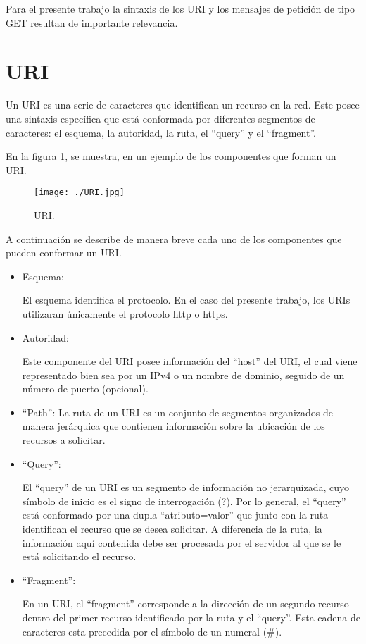 Para el presente trabajo la sintaxis de los URI y los mensajes de petición de tipo GET resultan de importante relevancia.

\section{URI} \label{URIsection}

Un URI es una serie de caracteres que identifican un recurso en la red. Este posee una sintaxis específica que está conformada por diferentes segmentos de caracteres: el esquema, la autoridad, la ruta, el ``query'' y el ``fragment''.

En la figura \ref{fig:URI}, se muestra, en un ejemplo de los componentes que forman un URI.

\begin{figure}[H]
\begin{center}
\texttt{[image: ./URI.jpg]}
\caption{URI.}
\label{fig:URI}
\end{center}
\end{figure}

A continuaci\'on se describe de manera breve cada uno de los componentes que pueden conformar un URI.

\begin{itemize}

\item Esquema:

El esquema identifica el protocolo. En el caso del presente trabajo, los URIs utilizaran únicamente el protocolo http o https.


\item Autoridad:

Este componente del URI posee información del ``host'' del URI, el cual viene representado bien sea por un IPv4 o un nombre de dominio, seguido de un número de puerto (opcional).
   
\item ``Path'':
La ruta de un URI es un conjunto de segmentos organizados de manera jerárquica que contienen información sobre la ubicación de los recursos a solicitar.

\item ``Query'':

El ``query'' de un URI es un segmento de información no jerarquizada, cuyo símbolo de inicio es el signo de interrogación (?). Por lo general, el ``query'' está conformado por una dupla ``atributo=valor'' que junto con la ruta identifican el recurso que se desea solicitar. A diferencia de la ruta, la información aquí contenida debe ser procesada por el servidor al que se le está solicitando el recurso. 

\item ``Fragment'':

En un URI, el ``fragment'' corresponde a la dirección de un segundo recurso dentro del primer recurso identificado por la ruta y el ``query''. Esta cadena de caracteres esta precedida por el símbolo de un numeral (\#).

\end{itemize}

